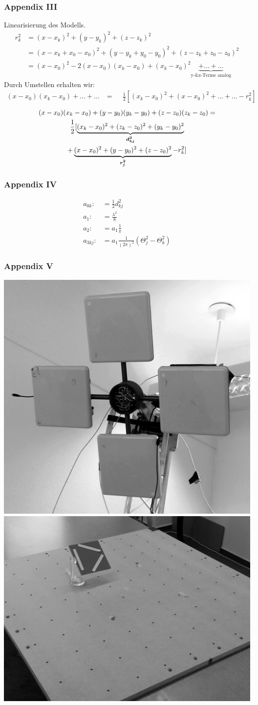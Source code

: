 \begin{frame}[noframenumbering]
  	\frametitle{Appendix III}
%
Linearisierung des Modells.
%
\begin{align}
	r_{k}^2 &= (x-x_k)^2+(y-y_k)^2+(z-z_k)^2 \nonumber \\
	&=(x-x_k+x_0-x_0)^2+(y-y_k+y_0-y_0)^2+(z-z_k+z_0-z_0)^2 \nonumber \\
	&=(x-x_0)^2-2(x-x_0)(x_k-x_0)+(x_k-x_0)^2\underbrace{+\dots{}+\dots{}}_\text{y-\& z-Terme analog}
	\label{eq:tri_temp1}
%
\end{align}
%
Durch Umstellen erhalten wir:
\begin{align}
(x-x_0)(x_k-x_0)+\dots{}+\dots{}&=\phantom{-}\frac{1}{2}[(x_k-x_0)^2 +(x-x_0)^2 +\dots{}+\dots{}-r_k^2]\nonumber
%
\end{align}
%
\begin{multline}
	(x-x_0)(x_k-x_0)+(y-y_0)(y_k-y_0)+(z-z_0)(z_k-z_0)= \\\frac{1}{2}[\underbrace{(x_k-x_0)^2+(z_k-z_0)^2+(y_k-y_0)^2}_\text{\boldmath{$d_{kj}^2$}}
	\\+\underbrace{(x-x_0)^2+(y-y_0)^2 +(z-z_0)^2}_\text{\boldmath{$r_j^2$}}-r_k^2]
\end{multline}
	
%
\end{frame}
\begin{frame}[noframenumbering]
  	\frametitle{Appendix IV}
%
\begin{align*}
a_{0k} :&= \frac{1}{2}d_{kj}^2\\
a_1 :&= \frac{\lambda^2}{8}\\
a_2 :&= a_1\frac{1}{\pi}\\
a_{3kj} :&= a_1\frac{1}{(2\pi)^2}(\Theta_j^2-\Theta_k^2)
\end{align*}
\end{frame}
\begin{frame}[noframenumbering]
  	\frametitle{Appendix V}
%
  \begin{center}
  \includegraphics[width=.3\textwidth]{../img/4AntennaSetup_small.png}
  \qquad
  \includegraphics[width=.3\textwidth]{../img/Calibration_Plate1.png}
  \end{center}
\end{frame}
